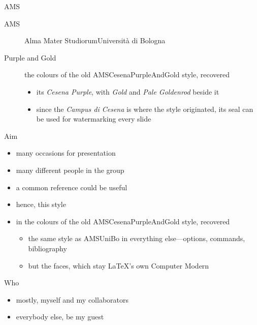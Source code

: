\documentclass[presentation,cesena,apice]{beamer}\mode<presentation>{\usetheme{AMSPurpleAndGold}}
\begin{document}
\begin{frame}[c]{AMS}
%
\begin{description}
	\item[AMS] Alma Mater Studiorum\textendash{}Università di Bologna
	\item[Purple and Gold] the colours of the old \alert{AMSCesenaPurpleAndGold} style, recovered
	\begin{itemize}
		\item its \textcolor{pgpurple}{\textit{Cesena Purple}}, with \textcolor{pggolddark}{\textit{Gold}} and \textcolor{pggreymid}{\textit{Pale Goldenrod}} beside it
		\item since the \emph{Campus di Cesena} is where the style originated, its seal can be used for watermarking every slide
	\end{itemize}
\end{description}
%
\end{frame}

\begin{frame}[c]{Aim}
%
\begin{itemize}
	\item many occasions for presentation
	\item many different people in the group
	\item a common reference could be useful
	\item hence, this style
	\item in the colours of the old \alert{AMSCesenaPurpleAndGold} style, recovered
	\begin{itemize}
		\item the same style as \alert{AMSUniBo} in everything else---options, commands, bibliography
		\item but the faces, which stay \LaTeX{}'s own Computer Modern
	\end{itemize}
\end{itemize}
%
\end{frame}

\begin{frame}[c]{Who}
%
\begin{itemize}
	\item mostly, myself and my collaborators
	\item everybody else, be my guest
\end{itemize}
%
\end{frame}
\end{document}
